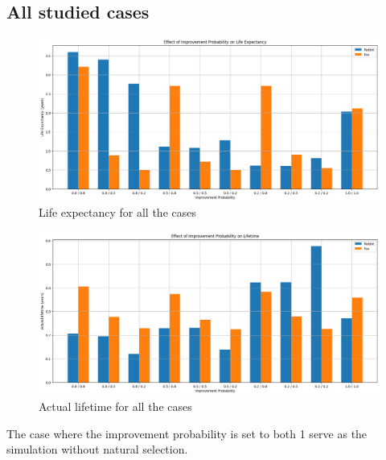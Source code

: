 \documentclass[conference]{IEEEtran}
\begin{document}
    \subsection{All studied cases}

    \begin{figure}[!ht]
    \centering
    \includegraphics[width=\columnwidth]{media/overal_lf.png}
    \caption[short]{Life expectancy for all the cases}
    \label{fig:lf_all}
    \end{figure}

    \begin{figure}[!ht]
    \centering
    \includegraphics[width=\columnwidth]{media/overal_l.png}
    \caption[short]{Actual lifetime for all the cases}
    \label{fig:l_all}
    \end{figure}

    The case where the improvement probability is set to both 1 serve as the simulation without natural selection.

%
%
\end{document}
